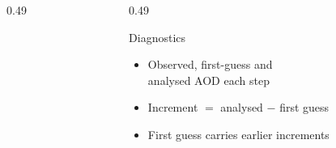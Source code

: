 \begin{frame}[t]
\begin{columns}[T]
\begin{column}{0.49\textwidth}
\end{column}
\begin{column}{0.49\textwidth}
\begin{block}{Diagnostics}
\begin{itemize}
  \item Observed, first-guess and\\analysed AOD each step
  \item Increment $=$ analysed $-$ first guess
  \item First guess carries earlier increments
\end{itemize}
\end{block}
\end{column}
\end{columns}
\end{frame}
